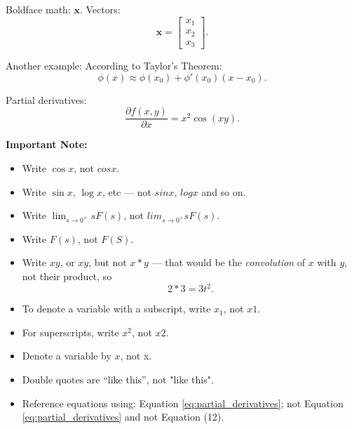    Boldface math: $\bm{x}$. Vectors:
    \begin{equation}
        \bm{x} = 
        \begin{bmatrix}
            x_1
            \\
            x_2
            \\
            x_3
        \end{bmatrix}.
    \end{equation}
    
    Another example: According to Taylor's Theorem:
    \begin{equation}
        \phi(x) \approx \phi(x_0) + \phi'(x_0)(x-x_0).
    \end{equation}
    
    Partial derivatives:
    \begin{equation}
        \label{eq:partial_derivatives}
        \frac{\partial f(x, y)}{\partial x} = x^2\cos(xy).
    \end{equation}
    
    \begin{tcolorbox}[title={Common typesetting mistakes}]
        \textbf{Important Note:} 
        \begin{itemize}
            \item Write $\cos x$, not $cos x$.
            \item Write $\sin x$, $\log x$, etc --- not $sin x$, $log x$ and so on.
            \item Write $\lim_{s\to 0^+} sF(s)$, not $lim_{s\to 0^+} sF(s)$.
            \item Write $F(s)$, not $F(S)$. 
            \item Write $xy$, or $x\dot y$, but not $x*y$ --- that would be the \textit{convolution} of     $x$ with $y$, not their product, so
                \begin{equation}
                    2 * 3 = 3t^2.
                \end{equation}
            \item To denote a variable with a subscript, write $x_1$, not $x1$.
            \item For superscripts, write $x^2$, not $x2$.
            \item Denote a variable by $x$, not x. 
            \item Double quotes are ``like this'', not "like this".
            \item Reference equations using: Equation \eqref{eq:partial_derivatives}; not Equation \ref{eq:partial_derivatives} and not Equation (12).
        \end{itemize}
    \end{tcolorbox}
    
